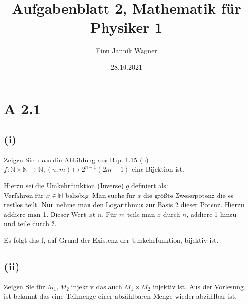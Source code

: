\documentclass{article}
\date{28.10.2021}
\title{Aufgabenblatt 2, Mathematik für Physiker 1}
\author{Finn Jannik Wagner}
\begin{document}
    \maketitle
    
    \section*{A 2.1}
        \subsection*{(i)}
        \large Zeigen Sie, dass die Abbildung aus Bsp. 1.15 (b)
        \(f : \mathbb{N} \times \mathbb{N} \to \mathbb{N}, (n, m) \mapsto 2^{n-1} (2m -1)\)
        eine Bijektion ist.

        Hierzu sei die Umkehrfunktion (Inverse) \(g\) definiert als: \\
        Verfahren für \(x \in \mathbb{N}\) beliebig: 
        Man suche für \(x\) die größte Zweierpotenz die es restlos teilt. Nun nehme man den Logarithmus zur Basis 2 dieser Potenz.
        Hierzu addiere man 1. Dieser Wert ist \(n\).
        Für \(m\) teile man \(x\) durch \(n\), addiere 1 hinzu und teile durch 2.

        Es folgt das f, auf Grund der Existenz der Umkehrfunktion, bijektiv ist.
        
        \subsection*{(ii)}
        Zeigen Sie für \(M_1, M_2\) injektiv das auch \(M_1 \times M_2\) injektiv ist.
        Aus der Vorlesung ist bekannt das eine Teilmenge einer abzählbaren Menge wieder abzählbar ist.
\end{document}
